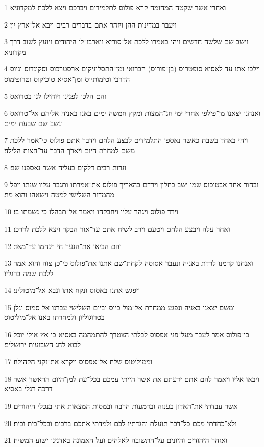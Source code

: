 \par 1 ואחרי אשר שקטה המהומה קרא פולוס לתלמידים ויברכם ויצא ללכת למקדוניא׃
\par 2 ויעבר במדינות ההן ויזהר אתם בדברים רבים ויבא אל־ארץ יון׃
\par 3 וישב שם שלשה חדשים ויהי באמרו ללכת אל־סוריא ויארבו־לו היהודים ויועץ לשוב דרך מקדוניא׃
\par 4 וילכו אתו עד לאסיא סופטרוס (בן־פורוס) הברואי ומן־התסלוניקים ארסטרכוס וסקונדוס וגיוס הדרבי וטימותיוס ומן־אסיא טוכיקוס וטרופימוס׃
\par 5 והם הלכו לפנינו ויוחילו לנו בטרואס׃
\par 6 ואנחנו יצאנו מן־פילפי אחרי ימי חג־המצות ומקץ חמשה ימים באנו באניה אליהם אל־טרואס ונשב שם שבעת ימים׃
\par 7 ויהי באחד בשבת כאשר נאספו התלמידים לבצע הלחם וידבר אתם פולוס כי־אמר ללכת משם למחרת היום ויארך הדבר עד־חצות הלילה׃
\par 8 ונרות רבים דלקים בעליה אשר נאספנו שם׃
\par 9 ובחור אחד אבטוכוס שמו ישב בחלון וירדם בהאריך פולוס את־אמרתו ותגבר עליו שנתו ויפל מהמדור השלישי למטה וישאהו והוא מת׃
\par 10 וירד פולוס ויגהר עליו ויחבקהו ויאמר אל־תבהלו כי נשמתו בו׃
\par 11 ואחר עלה ויבצע הלחם ויטעם וירב לשיח אתם עד־אור הבקר ויצא ללכת לדרכו׃
\par 12 והם הביאו את־הנער חי וינחמו עד־מאד׃
\par 13 ואנחנו קדמנו לרדת באניה ונעבר אסוסה לקחת־שם אתנו את־פולוס כי־כן צוה והוא אמר ללכת שמה ברגליו׃
\par 14 ויפגש אתנו באסוס ונקח אתו ונבא אל־מיטוליני׃
\par 15 ומשם יצאנו באניה ונפגע ממחרת אל־מול כיוס וביום השלישי עברנו אל סמוס ונלן בטרוגוליון ולמחרתו באנו אל־מיליטוס׃
\par 16 כי־פולוס אמר לעבר מעל־פני אפסוס לבלתי הצטרך להתמהמה באסיא כי אץ אולי יוכל לבוא לחג השבועות ירושלים׃
\par 17 וממיליטוס שלח אל־אפסוס ויקרא את־זקני הקהילה׃
\par 18 ויבאו אליו ויאמר להם אתם ידעתם את אשר הייתי עמכם בכל־עת למן־היום הראשון אשר דרכה רגלי באסיא׃
\par 19 אשר עבדתי את־האדון בענוה ובדמעות הרבה ובמסות המצאות אתי בנכלי היהודים׃
\par 20 ולא־כחדתי מכם כל־דבר תועלת והגדתיו לכם ולמדתי אתכם ברבים ובכל־בית ובית׃
\par 21 ואזהר היהודים והיונים על־התשובה לאלהים ועל האמונה באדנינו ישוע המשיח׃
